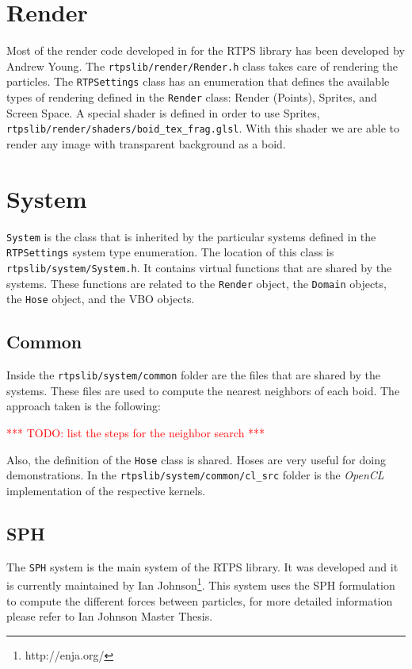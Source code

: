 \section{Render}
Most of the render code developed in for the RTPS library has been developed by Andrew Young. The \texttt{rtpslib/render/Render.h} class takes care of rendering the particles. The \texttt{RTPSettings} class has an enumeration that defines the available types of rendering defined in the \texttt{Render} class: Render (Points), Sprites, and Screen Space. A special shader is defined in order to use Sprites, \texttt{rtpslib/render/shaders/boid\_tex\_frag.glsl}. With this shader we are able to render any image with transparent background as a boid.

\section{System}
\texttt{System} is the class that is inherited by the particular systems defined in the \texttt{RTPSettings} system type enumeration. The location of this class is \texttt{rtpslib/system/System.h}. It contains virtual functions that are shared by the systems. These functions are related to the \texttt{Render} object,  the \texttt{Domain} objects, the \texttt{Hose} object, and the VBO objects.

\subsection{Common}
Inside the \texttt{rtpslib/system/common} folder are the files that are shared by the systems. These files are used to compute the nearest neighbors of each boid. The approach taken is the following:

\textcolor{red}{*** TODO:  list the steps for the neighbor search ***}

Also, the definition of the \texttt{Hose} class is shared. Hoses are very useful for doing demonstrations. In the \texttt{rtpslib/system/common/cl\_src} folder is the \textit{OpenCL} implementation of the respective kernels.

\subsection{SPH}
The \texttt{SPH} system is the main system of the RTPS library. It was developed and it is currently maintained by Ian Johnson\footnote{http://enja.org/}\cite{ianPaper}. This system uses the SPH formulation to compute the different forces between particles, for more detailed information please refer to Ian Johnson Master Thesis\cite{ianThesis}.

